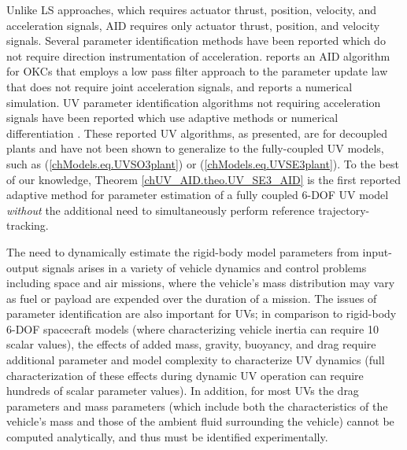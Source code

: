 Unlike \ac{LS} approaches, which requires actuator thrust, position, velocity,
and acceleration signals, \ac{AID} requires only actuator thrust,
position, and velocity signals.
%
Several parameter identification methods have been reported which do not
require direction instrumentation of acceleration.
% 
\cite{hsu&bodson&sastry&paden.icra87} reports an \ac{AID} algorithm
for \acp{OKC} that employs a low pass filter approach to the parameter
update law that does not require joint acceleration signals, and
reports a numerical simulation.
%
\ac{UV} parameter identification algorithms not requiring acceleration
signals have been reported which use adaptive methods
\cite{smallwood2003TCST} or numerical differentiation
\cite{ridao2004identification,avila2012modeling}.
% 
These reported \ac{UV} algorithms, as presented, are for decoupled
plants and have not been shown to generalize to the fully-coupled
\ac{UV} models, such as (\ref{chModels.eq.UVSO3plant}) or
(\ref{chModels.eq.UVSE3plant}).
%
To the best of our knowledge, Theorem \ref{chUV_AID.theo.UV_SE3_AID} is
the first reported adaptive method for parameter estimation of a
fully coupled 6-\ac{DOF} \ac{UV} model {\it without} the additional need to
simultaneously perform reference trajectory-tracking.


The need to dynamically estimate  the rigid-body model parameters from
input-output signals arises in a variety of vehicle dynamics and
control problems including space and air missions, where the vehicle's
mass distribution may vary as fuel or payload are expended over the
duration of a mission.
%
The issues of parameter identification are also important for
\acp{UV}; in comparison to rigid-body 6-\ac{DOF} spacecraft models
(where characterizing vehicle inertia can require 10 scalar values),
the effects of added mass, gravity, buoyancy, and drag require
additional parameter and model complexity to characterize \ac{UV}
dynamics (full characterization of these effects during dynamic \ac{UV}
operation can require hundreds of scalar parameter values).
%
In addition, for most \acp{UV} the drag parameters and mass parameters
(which include both the characteristics of the vehicle's mass and
those of the ambient fluid surrounding the vehicle) cannot be computed
analytically, and thus must be identified experimentally. 


